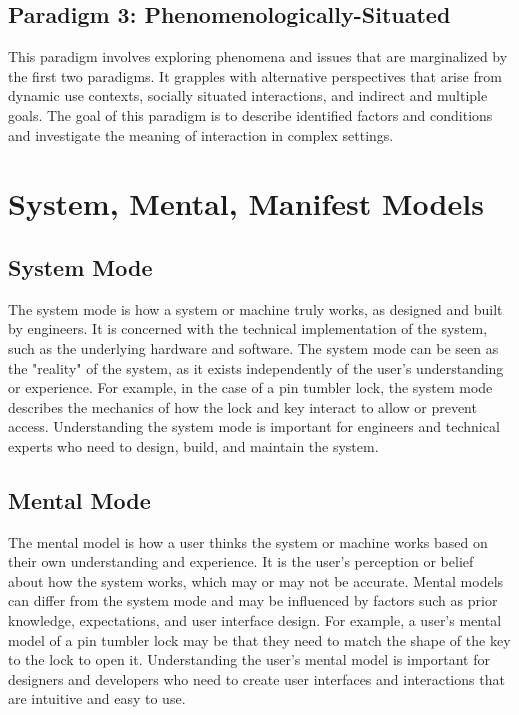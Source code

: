 \documentclass{article}
\begin{document}
\subsection{Paradigm 3: Phenomenologically-Situated}
This paradigm involves exploring phenomena and issues that are marginalized by the first two paradigms. It grapples with alternative perspectives that arise from dynamic use contexts, socially situated interactions, and indirect and multiple goals. The goal of this paradigm is to describe identified factors and conditions and investigate the meaning of interaction in complex settings.


\section{System, Mental, Manifest Models}
\subsection{System Mode}
The system mode is how a system or machine truly works, as designed and built by engineers. It is concerned with the technical implementation of the system, such as the underlying hardware and software. The system mode can be seen as the "reality" of the system, as it exists independently of the user's understanding or experience. For example, in the case of a pin tumbler lock, the system mode describes the mechanics of how the lock and key interact to allow or prevent access. Understanding the system mode is important for engineers and technical experts who need to design, build, and maintain the system.
\subsection{Mental Mode}
The mental model is how a user thinks the system or machine works based on their own understanding and experience. It is the user's perception or belief about how the system works, which may or may not be accurate. Mental models can differ from the system mode and may be influenced by factors such as prior knowledge, expectations, and user interface design. For example, a user's mental model of a pin tumbler lock may be that they need to match the shape of the key to the lock to open it. Understanding the user's mental model is important for designers and developers who need to create user interfaces and interactions that are intuitive and easy to use.
\end{document}
